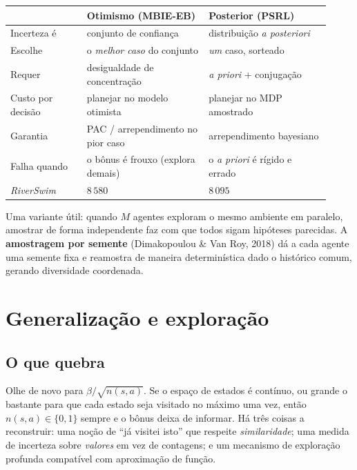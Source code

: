 \documentclass[11pt, a4paper]{article}
\begin{document}
\begin{center}\small
\begin{tabular}{@{}p{0.22\linewidth}p{0.35\linewidth}p{0.35\linewidth}@{}}
\toprule
 & \textbf{Otimismo (MBIE-EB)} & \textbf{Posterior (PSRL)} \\
\midrule
Incerteza é       & conjunto de confiança & distribuição \textit{a posteriori} \\
Escolhe           & o \emph{melhor caso} do conjunto & \emph{um} caso, sorteado \\
Requer            & desigualdade de concentração & \textit{a priori} + conjugação \\
Custo por decisão & planejar no modelo otimista & planejar no MDP amostrado \\
Garantia          & PAC / arrependimento no pior caso & arrependimento bayesiano \\
Falha quando      & o bônus é frouxo (explora demais) & o \textit{a priori} é rígido e errado \\
\textit{RiverSwim} & $8\,580$ & $8\,095$ \\
\bottomrule
\end{tabular}
\end{center}

Uma variante útil: quando $M$ agentes exploram o mesmo ambiente em paralelo, amostrar de
forma independente faz com que todos sigam hipóteses parecidas. A \textbf{amostragem por
semente} (Dimakopoulou \& Van Roy, 2018) dá a cada agente uma semente fixa e reamostra de
maneira determinística dado o histórico comum, gerando diversidade coordenada.

\section{Generalização e exploração}

\subsection{O que quebra}

Olhe de novo para $\beta/\sqrt{n(s,a)}$. Se o espaço de estados é contínuo, ou grande o
bastante para que cada estado seja visitado no máximo uma vez, então $n(s,a) \in \{0,1\}$
sempre e o bônus deixa de informar. Há três coisas a reconstruir: uma noção de ``já
visitei isto'' que respeite \emph{similaridade}; uma medida de incerteza sobre
\emph{valores} em vez de contagens; e um mecanismo de exploração profunda compatível com
aproximação de função.
\end{document}
